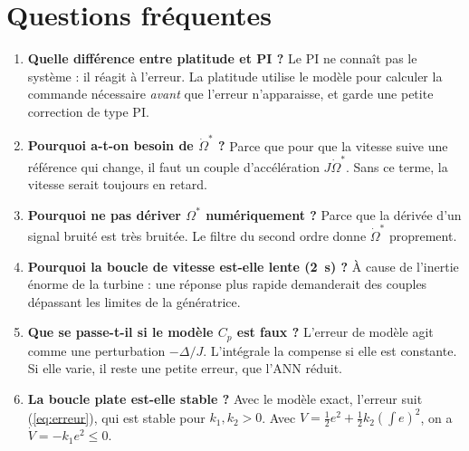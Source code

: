 \documentclass[11pt,a4paper]{article}
\begin{document}
\section{Questions fréquentes}
\begin{enumerate}
\item \textbf{Quelle différence entre platitude et PI ?}
Le PI ne connaît pas le système : il réagit à l'erreur. La platitude utilise le modèle pour calculer la
commande nécessaire \emph{avant} que l'erreur n'apparaisse, et garde une petite correction de type PI.

\item \textbf{Pourquoi a-t-on besoin de $\dot\Omega^*$ ?}
Parce que pour que la vitesse suive une référence qui change, il faut un couple d'accélération
$J\dot\Omega^*$. Sans ce terme, la vitesse serait toujours en retard.

\item \textbf{Pourquoi ne pas dériver $\Omega^*$ numériquement ?}
Parce que la dérivée d'un signal bruité est très bruitée. Le filtre du second ordre donne $\dot\Omega^*$
proprement.

\item \textbf{Pourquoi la boucle de vitesse est-elle lente (2~s) ?}
À cause de l'inertie énorme de la turbine : une réponse plus rapide demanderait des couples dépassant les
limites de la génératrice.

\item \textbf{Que se passe-t-il si le modèle $C_p$ est faux ?}
L'erreur de modèle agit comme une perturbation $-\Delta/J$. L'intégrale la compense si elle est constante.
Si elle varie, il reste une petite erreur, que l'ANN réduit.

\item \textbf{La boucle plate est-elle stable ?}
Avec le modèle exact, l'erreur suit (\ref{eq:erreur}), qui est stable pour $k_1, k_2 > 0$. Avec
$V = \tfrac12 e^2 + \tfrac12 k_2(\int e)^2$, on a $\dot V = -k_1 e^2 \le 0$.
\end{enumerate}
\end{document}
